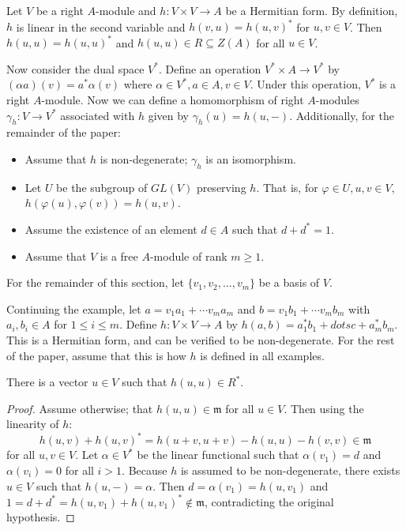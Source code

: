 Let $V$ be a right $A$-module and $h: V \times V \to A$ be a Hermitian form.
By definition, $h$ is linear in the second variable and $h(v, u) = h(u, v)^*$ for $u, v \in V$.
Then $h(u,u) = h(u,u)^*$ and $h(u,u) \in R \subseteq Z(A)$ for all $u \in V$.

Now consider the dual space $V^*$. Define an operation $V^* \times A \to V^*$ by $(\alpha a)(v) = a^* \alpha(v)$ where $\alpha \in V^*, a \in A, v \in V$.
Under this operation, $V^*$ is a right $A$-module.
Now we can define a homomorphism of right $A$-modules $\gamma_h: V \to V^*$ associated with $h$ given by $\gamma_h(u) = h(u, -)$.
Additionally, for the remainder of the paper:
\begin{itemize}
\item Assume that $h$ is non-degenerate; $\gamma_h$ is an isomorphism.
\item Let $U$ be the subgroup of $GL(V)$ preserving $h$. That is, for $\varphi \in U, u,v \in V$, $h(\varphi(u), \varphi(v)) = h(u,v)$.
\item Assume the existence of an element $d \in A$ such that $d + d^* = 1$.
\item Assume that $V$ is a free $A$-module of rank $m \ge 1$.
\end{itemize}
For the remainder of this section, let $\{v_1, v_2, \dotsc, v_m\}$ be a basis of $V$.

\begin{example}\label{ex2.2}
Continuing the example, let $a = v_1 a_1 + \dotsb v_m a_m$ and $b = v_1 b_1 + \dotsb v_m b_m$ with $a_i, b_i \in A$ for $1 \le i \le m$.
Define $h: V \times V \to A$ by $h(a, b) = a_1^* b_1 + dotsc + a_m^* b_m$.
This is a Hermitian form, and can be verified to be non-degenerate.
For the rest of the paper, assume that this is how $h$ is defined in all examples.
\end{example}

\begin{lemma}\label{lemma2.1}
There is a vector $u \in V$ such that $h(u,u) \in R^*$.
\end{lemma}
\begin{proof}
Assume otherwise; that  $h(u,u) \in \mathfrak{m}$ for all $u \in V$.
Then using the linearity of $h$:
\[
h(u,v) + h(u,v)^* = h(u+v, u+v) - h(u,u) - h(v,v) \in \mathfrak{m}
\]
for all $u,v \in V$.
Let $\alpha \in V^*$ be the linear functional such that $\alpha(v_1) = d$ and $\alpha(v_i) = 0$ for all $i > 1$.
Because $h$ is assumed to be non-degenerate, there exists $u \in V$ such that $h(u,-) = \alpha$.
Then $d = \alpha(v_1) = h(u,v_1)$ and $1 = d + d^* = h(u,v_1) + h(u,v_1)^* \not\in \mathfrak{m}$, contradicting the original hypothesis.
\end{proof}


